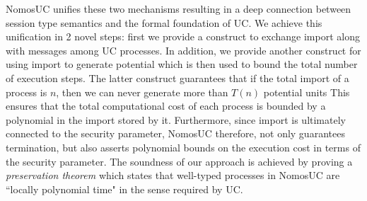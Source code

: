 NomosUC unifies these two mechanisms resulting in a deep connection between session type
semantics and the formal foundation of UC.
We achieve this unification in 2 novel steps: first we provide a construct to exchange import along
with messages among UC processes.
In addition, we provide another construct for using import to generate potential which
is then used to bound the total number of execution steps.
The latter construct guarantees that if the total import of a process is $n$, then we
can never generate more than $T(n)$ potential units
This ensures that the total computational cost of each process is bounded by a polynomial
in the import stored by it.
Furthermore, since import is ultimately connected to the security parameter, NomosUC
therefore, not only guarantees termination, but also asserts polynomial bounds on
the execution cost in terms of the security parameter.
The soundness of our approach is achieved by proving a \emph{preservation theorem}
which states that well-typed processes in NomosUC are ``locally polynomial time"
in the sense required by UC.
%




